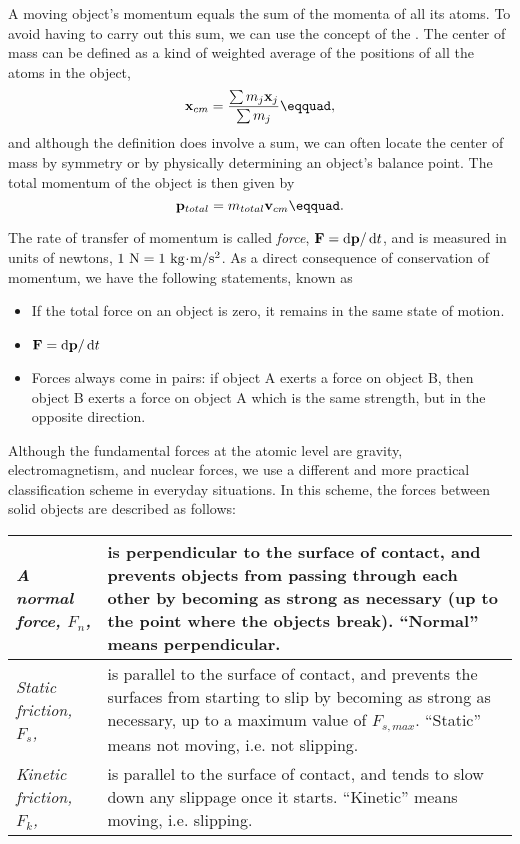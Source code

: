 	A moving object's momentum equals the sum of the momenta of all its atoms.
	To avoid having to carry out this sum, we can use the concept of the . The center of mass can be defined as a kind of weighted
	average of the positions of all the atoms in the object,
	\begin{equation*}
		\vc{x}_{cm} = \frac{\sum m_j\vc{x}_j}{\sum m_j}\eqquad,
	\end{equation*}
	and although the definition does involve a sum, we can often locate the center of
	mass by symmetry or by physically determining an object's balance point.
	The total momentum of the object is then given by
	\begin{equation*}
		\vc{p}_{total} = m_{total}\vc{v}_{cm}\eqquad.
	\end{equation*}
	
	The rate of transfer of momentum is called \emph{force}, $\mathbf{F}=\operatorname{d\!} \mathbf{p}/\operatorname{d\!} t$, and
	is measured in units of newtons, $1\ \nunit=1\ \kgunit\unitdot\munit/\sunit^2$.
	As a direct consequence of conservation of momentum, we have the following
	statements, known as 
	\begin{itemize}
		\item[] If the total force on an object is
			zero, it remains in the same state of motion.
		\item[] $\mathbf{F}=\operatorname{d\!} \mathbf{p}/\operatorname{d\!} t$
		\item[] Forces always come in pairs: if object A exerts a force on object B,
			then object B exerts a force on object A which is the same strength, but
			in the opposite direction.
	\end{itemize}
	
	Although the fundamental forces at the atomic level are gravity, electromagnetism,
	and nuclear forces, we use a different and more practical classification scheme in
	everyday situations. In this scheme, the forces between solid objects are
	described as follows:\\
		\noindent\begin{tabular}{|lp{90mm}|}
		\hline
		\emph{A normal force, $F_n$,} 
			& is perpendicular to the surface of contact, and prevents objects
				from passing through each other by becoming as strong
				as necessary (up to the point where the objects break).
				``Normal'' means perpendicular. \\
		\hline
		\emph{Static friction, $F_s$,} 
			& is parallel to the surface of contact, and prevents the surfaces from
				starting to slip by becoming as strong as necessary, up
				to a maximum value of $F_{s,max}$. 
				``Static'' means not moving, i.e. not slipping.\\
		\hline
		\emph{Kinetic friction, $F_k$,} 
			& is parallel to the surface of contact, and tends to slow down
				any slippage once it starts.
				``Kinetic'' means moving, i.e. slipping. \\
		\hline
	\end{tabular}
	
